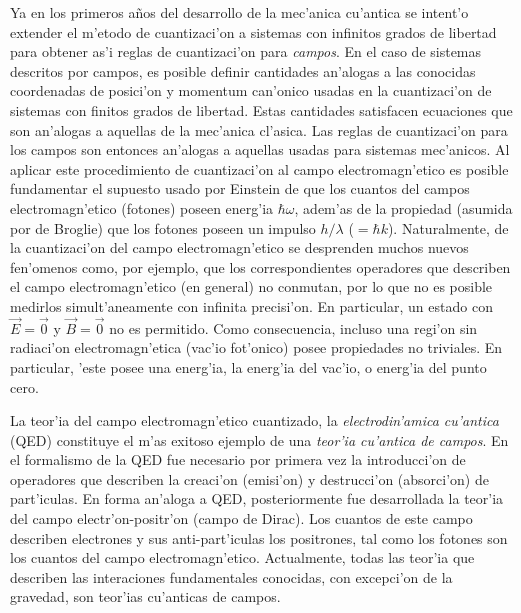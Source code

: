 Ya en los primeros años del desarrollo de la mec'anica cu'antica se
intent'o extender el m'etodo de cuantizaci'on a sistemas con infinitos
grados de libertad para obtener as'i reglas de cuantizaci'on para
\textit{campos}. En el caso de sistemas descritos por campos, es
posible definir cantidades an'alogas a las conocidas coordenadas de
posici'on y momentum can'onico usadas en la cuantizaci'on de sistemas
con finitos grados de libertad. Estas cantidades satisfacen
ecuaciones que son an'alogas a aquellas de la mec'anica cl'asica. Las
reglas de cuantizaci'on para los campos son entonces an'alogas a
aquellas usadas para sistemas mec'anicos. Al aplicar este
procedimiento de cuantizaci'on al campo electromagn'etico es posible
fundamentar el supuesto usado por Einstein de que los cuantos del
campos electromagn'etico (fotones) poseen energ'ia $\hbar\omega$,
adem'as de la propiedad (asumida por de Broglie) que los fotones
poseen un impulso $h/\lambda$ ($=\hbar k$). Naturalmente, de la
cuantizaci'on del campo electromagn'etico se desprenden muchos nuevos
fen'omenos como, por ejemplo, que los correspondientes operadores que
describen el campo electromagn'etico (en general) no conmutan, por lo
que no es posible medirlos simult'aneamente con infinita precisi'on.
En particular, un estado con $\vec{E}=\vec{0}$ y $\vec{B}=\vec{0}$
no es permitido. Como consecuencia, incluso una regi'on sin radiaci'on
electromagn'etica (vac'io fot'onico) posee propiedades no triviales. En
particular, 'este posee una energ'ia, la energ'ia del vac'io, o energ'ia
del punto cero.

La teor'ia del campo electromagn'etico cuantizado, la
\textit{electrodin'amica cu'antica} (QED) constituye el m'as exitoso
ejemplo de una \textit{teor'ia cu'antica de campos}. En el formalismo
de la QED fue necesario por primera vez la introducci'on de
operadores que describen la creaci'on (emisi'on) y destrucci'on
(absorci'on) de part'iculas. En forma an'aloga a QED, posteriormente
fue desarrollada la teor'ia del campo electr'on-positr'on (campo de
Dirac). Los cuantos de este campo describen electrones y sus
anti-part'iculas los positrones, tal como los fotones son los cuantos
del campo electromagn'etico. Actualmente, todas las teor'ia que
describen las interaciones fundamentales conocidas, con excepci'on de
la gravedad, son teor'ias cu'anticas de campos.

